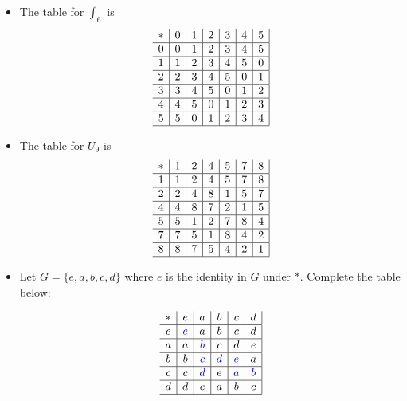     \begin{example}
        \mbox{}

        \begin{itemize}
            \item The table for \(\int_6\) is 
            \[
                \begin{array}{c|c|c|c|c|c|c|}
                    * & 0 & 1 & 2 & 3 & 4 & 5 \\ \hline
                    0 & 0 & 1 & 2 & 3 & 4 & 5 \\ \hline
                    1 & 1 & 2 & 3 & 4 & 5 & 0 \\ \hline
                    2 & 2 & 3 & 4 & 5 & 0 & 1 \\ \hline
                    3 & 3 & 4 & 5 & 0 & 1 & 2 \\ \hline
                    4 & 4 & 5 & 0 & 1 & 2 & 3 \\ \hline
                    5 & 5 & 0 & 1 & 2 & 3 & 4 \\ \hline
                \end{array}
            \]

            \item The table for \(U_9\) is
            \[
                \begin{array}{c|c|c|c|c|c|c|}
                    * & 1 & 2 & 4 & 5 & 7 & 8 \\ \hline
                    1 & 1 & 2 & 4 & 5 & 7 & 8 \\ \hline
                    2 & 2 & 4 & 8 & 1 & 5 & 7 \\ \hline
                    4 & 4 & 8 & 7 & 2 & 1 & 5 \\ \hline
                    5 & 5 & 1 & 2 & 7 & 8 & 4 \\ \hline
                    7 & 7 & 5 & 1 & 8 & 4 & 2 \\ \hline
                    8 & 8 & 7 & 5 & 4 & 2 & 1 \\ \hline
                \end{array}
            \]

            \item Let \(G = \{e, a, b, c, d\}\) where \(e\) is the identity in \(G\) under \(*\). Complete the table below: 

            \[
                \begin{array}{c|c|c|c|c|c|}
                    * & e & a & b & c & d \\ \hline
                    e & \color{blue}{e} & a & b & c & d \\ \hline
                    a & a & \color{blue}{b} & c & d & e \\ \hline
                    b & b & \color{blue}{c} & \color{blue}{d} & \color{blue}{e} & a \\ \hline
                    c & c & \color{blue}{d} & e & \color{blue}{a} & \color{blue}{b} \\ \hline
                    d & d & e & a & b & c \\ \hline
                \end{array}
            \]


\end{itemize}
\end{example}
